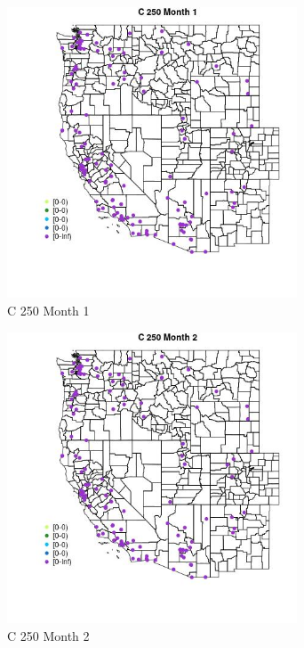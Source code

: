 \begin{figure} 
\centering  
\includegraphics[width=0.77\textwidth]{Code_Outputs/Report_ML_input_PM25_Step4_part_e_de_duplicated_aves_MapObsMo1C_250.jpg} 
\caption{\label{fig:Report_ML_input_PM25_Step4_part_e_de_duplicated_avesMapObsMo1C_250}C 250 Month 1} 
\end{figure} 
 

\begin{figure} 
\centering  
\includegraphics[width=0.77\textwidth]{Code_Outputs/Report_ML_input_PM25_Step4_part_e_de_duplicated_aves_MapObsMo2C_250.jpg} 
\caption{\label{fig:Report_ML_input_PM25_Step4_part_e_de_duplicated_avesMapObsMo2C_250}C 250 Month 2} 
\end{figure} 
 

